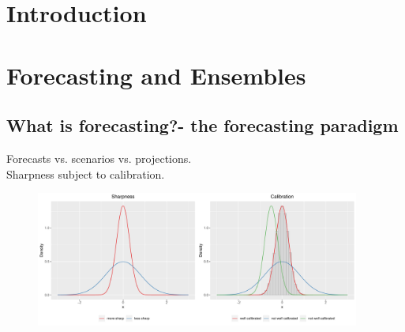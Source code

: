 









\tableofcontents

\clearpage

\listoffigures
\clearpage


\printacronyms
\clearpage





\normalsize
\vspace{2cm}
\section{Introduction}

\section{Forecasting and Ensembles}
\subsection{What is forecasting?- the forecasting paradigm}
Forecasts vs. scenarios vs. projections.\\
Sharpness subject to calibration.
\begin{figure}
\centering
\includegraphics[width = 0.95\textwidth]{../plots/sharp_calib.pdf}
\end{figure}
